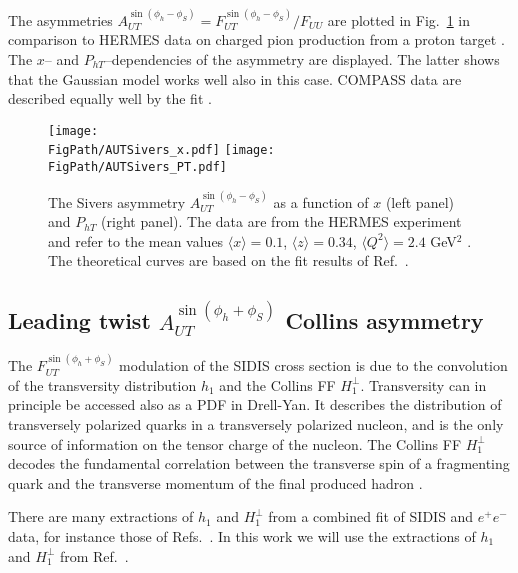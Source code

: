 \documentclass[a4paper,11pt]{article}
\newcommand{\blue}[1]{{\color{blue} #1}}
\newcommand{\la}{\langle}
\newcommand{\ra}{\rangle}
\newcommand{\ps}[1]{\blue{ #1}}
\newcommand*{\FigPath}{./figs}%
\begin{document}
The asymmetries $A_{UT}^{\sin(\phi_h-\phi_S)}= F_{UT}^{\sin(\phi_h-\phi_S)}/F_{UU}$  
\ps{are plotted in Fig.~\ref{aut_f1t_jlab} in comparison to HERMES data 
on charged pion production from a proton target \cite{Airapetian:2009ae}.
The $x$-- and $P_{hT}$--dependencies of the asymmetry are displayed. The 
latter shows that the Gaussian model works well also in this case.
COMPASS data are described equally well by the fit \cite{Anselmino:2011gs}. }

\begin{figure}[b!]
\centering
\texttt{[image: \\FigPath/AUTSivers\_x.pdf]}  \hspace{5mm}
\texttt{[image: \\FigPath/AUTSivers\_PT.pdf]}
\caption{\label{aut_f1t_jlab} The Sivers asymmetry $A_{UT}^{\sin(\phi_h-\phi_S)}$  
	as a function of $ x $ (left panel) and $P_{hT}$ (right panel).
	The data are from the HERMES experiment and refer to the mean values
	$\la x\ra = 0.1$, $\la z\ra = 0.34$, $\la Q^2\ra = 2.4$ GeV$^2$ 
	\cite{Airapetian:2009ae}. The theoretical curves are based on 
	the fit results of Ref.~\cite{Anselmino:2011gs}.}
\end{figure}



\newpage
\subsection{\boldmath Leading twist $A_{UT}^{\sin(\phi_h+\phi_S)}$ Collins asymmetry}
\label{Sec-5.4:Collins-basis}

The $F_{UT}^{\sin(\phi_h+\phi_S)}$ modulation of the SIDIS cross section is due 
to the convolution of the transversity distribution $h_1$ \ps{and the Collins 
FF $H_1^\perp$. Transversity can in principle be accessed also as a PDF in
Drell-Yan. It describes the distribution of transversely polarized quarks
in a transversely polarized nucleon, and} is the only source of information 
on the tensor charge of the nucleon. The Collins FF $H_1^\perp$ decodes the 
fundamental correlation between the transverse spin of a fragmenting quark 
and the transverse momentum of the final produced hadron \cite{Collins:1992kk}.

There are many extractions of $h_1$ and $H_1^\perp$ from a 
combined fit of SIDIS and $e^+e^-$ data, for instance those of 
Refs.~\cite{Anselmino:2013vqa,Kang:2014zza,Anselmino:2015sxa}.
In this work we will use the extractions of $h_1$ and $H_1^\perp$ 
from Ref.~\cite{Anselmino:2013vqa}.
\end{document}
